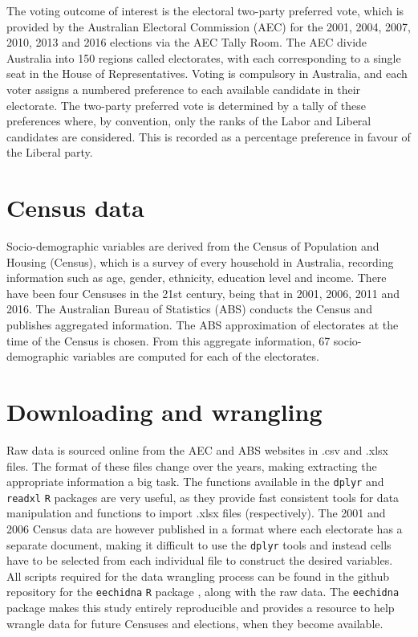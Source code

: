 \documentclass[openany]{book}
\begin{document}
The voting outcome of interest is the electoral two-party preferred vote, which is provided by the Australian Electoral Commission (AEC) for the 2001, 2004, 2007, 2010, 2013 and 2016 elections via the AEC Tally Room. The AEC divide Australia into 150 regions called electorates, with each corresponding to a single seat in the House of Representatives. Voting is compulsory in Australia, and each voter assigns a numbered preference to each available candidate in their electorate. The two-party preferred vote is determined by a tally of these preferences where, by convention, only the ranks of the Labor and Liberal candidates are considered. This is recorded as a percentage preference in favour of the Liberal party.

\hypertarget{census-data}{%
\section{Census data}\label{census-data}}

Socio-demographic variables are derived from the Census of Population and Housing (Census), which is a survey of every household in Australia, recording information such as age, gender, ethnicity, education level and income. There have been four Censuses in the 21st century, being that in 2001, 2006, 2011 and 2016. The Australian Bureau of Statistics (ABS) conducts the Census and publishes aggregated information. The ABS approximation of electorates at the time of the Census is chosen. From this aggregate information, 67 socio-demographic variables are computed for each of the electorates.

\hypertarget{downloading-and-wrangling}{%
\section{Downloading and wrangling}\label{downloading-and-wrangling}}

Raw data is sourced online from the AEC and ABS websites in .csv and .xlsx files. The format of these files change over the years, making extracting the appropriate information a big task. The functions available in the \texttt{dplyr} \citep{dplyr} and \texttt{readxl} \citep{readxl} \texttt{R} packages are very useful, as they provide fast consistent tools for data manipulation and functions to import .xlsx files (respectively). The 2001 and 2006 Census data are however published in a format where each electorate has a separate document, making it difficult to use the \texttt{dplyr} tools and instead cells have to be selected from each individual file to construct the desired variables. All scripts required for the data wrangling process can be found in the github repository for the \texttt{eechidna} \texttt{R} package \citep{eechidna}, along with the raw data. The \texttt{eechidna} package makes this study entirely reproducible and provides a resource to help wrangle data for future Censuses and elections, when they become available.
\end{document}
